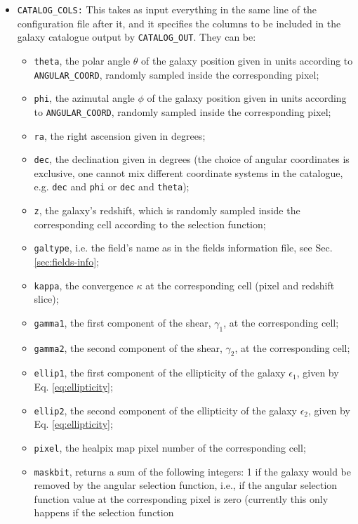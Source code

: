 \documentclass[12pt]{book} %
\begin{document}
\begin{itemize}
\item {\tt CATALOG\_COLS:} This takes as input everything in the same line of the configuration 
  file after it, and it specifies the columns to be included in the galaxy catalogue output by 
  {\tt CATALOG\_OUT}. They can be: 
  \begin{itemize}
  \item {\tt theta}, the polar angle $\theta$ of the galaxy position given in units according to 
    {\tt ANGULAR\_COORD}, randomly sampled inside the corresponding pixel; 
  \item {\tt phi}, the azimutal angle $\phi$ of the galaxy position given in units according to 
    {\tt ANGULAR\_COORD}, randomly sampled inside the corresponding pixel;
  \item {\tt ra}, the right ascension given in degrees;
  \item {\tt dec}, the declination given in degrees (the choice of angular coordinates is exclusive, 
    one cannot mix different coordinate systems in the catalogue, e.g. {\tt dec} and {\tt phi} or 
    {\tt dec} and {\tt theta});
  \item {\tt z}, the galaxy's redshift, which is randomly sampled inside the corresponding cell 
    according to the selection function; 
  \item {\tt galtype}, i.e. the field's name as in the fields information file, see Sec. \ref{sec:fields-info}; 
  \item {\tt kappa}, the convergence $\kappa$ at the corresponding cell (pixel and redshift slice);
  \item {\tt gamma1}, the first component of the shear, $\gamma_1$, at the corresponding cell;
  \item {\tt gamma2}, the second component of the shear, $\gamma_2$, at the corresponding cell; 
  \item {\tt ellip1}, the first component of the ellipticity of the galaxy $\epsilon_1$, 
    given by Eq. \ref{eq:ellipticity}; 
  \item {\tt ellip2}, the second component of the ellipticity of the galaxy $\epsilon_2$, 
    given by Eq. \ref{eq:ellipticity};
  \item {\tt pixel}, the {\sc healpix} map pixel number of the corresponding cell; 
  \item {\tt maskbit}, returns a sum of the following integers: 1 if the galaxy would 
    be removed by the angular selection function, i.e., if the angular selection function value 
    at the corresponding pixel is zero (currently this only happens if the selection function 

\end{itemize}
\end{itemize}
\end{document}
